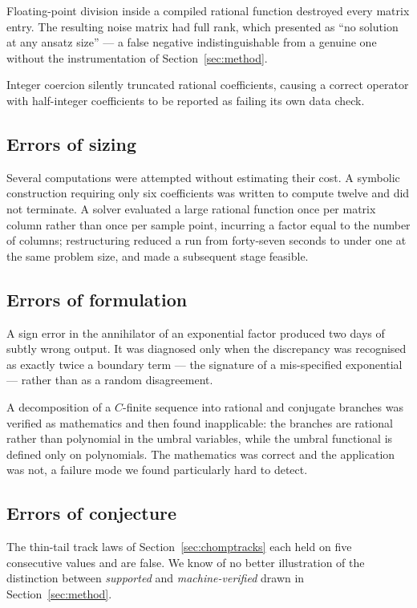 \documentclass[11pt]{article}
\theoremstyle{definition}
\begin{document}
Floating-point division inside a compiled rational function destroyed every
matrix entry. The resulting noise matrix had full rank, which presented as
``no solution at any ansatz size'' --- a false negative indistinguishable from
a genuine one without the instrumentation of Section~\ref{sec:method}.

Integer coercion silently truncated rational coefficients, causing a correct
operator with half-integer coefficients to be reported as failing its own data
check.

\subsection{Errors of sizing}

Several computations were attempted without estimating their cost. A symbolic
construction requiring only six coefficients was written to compute twelve and
did not terminate. A solver evaluated a large rational function once per matrix
column rather than once per sample point, incurring a factor equal to the
number of columns; restructuring reduced a run from forty-seven seconds to
under one at the same problem size, and made a subsequent stage feasible.

\subsection{Errors of formulation}

A sign error in the annihilator of an exponential factor produced two days of
subtly wrong output. It was diagnosed only when the discrepancy was recognised
as exactly twice a boundary term --- the signature of a mis-specified
exponential --- rather than as a random disagreement.

A decomposition of a $C$-finite sequence into rational and conjugate branches
was verified as mathematics and then found inapplicable: the branches are
rational rather than polynomial in the umbral variables, while the umbral
functional is defined only on polynomials. The mathematics was correct and the
application was not, a failure mode we found particularly hard to detect.

\subsection{Errors of conjecture}

The thin-tail track laws of Section~\ref{sec:chomptracks} each held on five
consecutive values and are false. We know of no better illustration of the
distinction between \emph{supported} and \emph{machine-verified} drawn in
Section~\ref{sec:method}.
\end{document}
